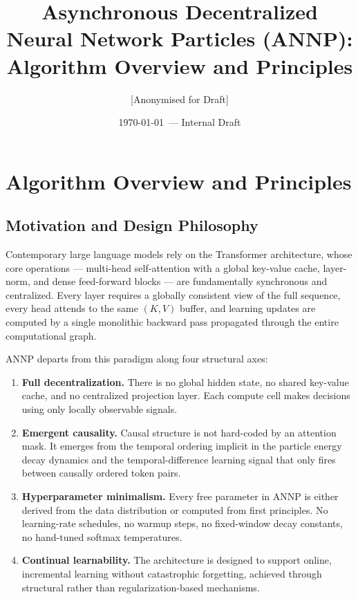 \documentclass[11pt,a4paper]{article}
\title{\textbf{Asynchronous Decentralized Neural Network Particles (ANNP):}\\
Algorithm Overview and Principles}
\author{[Anonymised for Draft]}
\date{\today\ --- Internal Draft}
\theoremstyle{definition}
\begin{document}
\maketitle
\tableofcontents
\newpage

\section{Algorithm Overview and Principles}
\label{sec:algorithm}

\subsection{Motivation and Design Philosophy}
\label{sec:motivation}

Contemporary large language models rely on the Transformer architecture, whose core operations ---
multi-head self-attention with a global key-value cache, layer-norm, and dense feed-forward blocks ---
are fundamentally synchronous and centralized.
Every layer requires a globally consistent view of the full sequence, every head attends to the same
$(K,V)$ buffer, and learning updates are computed by a single monolithic backward pass propagated
through the entire computational graph.

ANNP departs from this paradigm along four structural axes:

\begin{enumerate}[leftmargin=2em]
  \item \textbf{Full decentralization.}
    There is no global hidden state, no shared key-value cache, and no centralized projection layer.
    Each compute cell makes decisions using only locally observable signals.
  \item \textbf{Emergent causality.}
    Causal structure is not hard-coded by an attention mask.
    It emerges from the temporal ordering implicit in the particle energy decay dynamics and
    the temporal-difference learning signal that only fires between causally ordered token pairs.
  \item \textbf{Hyperparameter minimalism.}
    Every free parameter in ANNP is either derived from the data distribution or computed from
    first principles. No learning-rate schedules, no warmup steps, no fixed-window decay constants,
    no hand-tuned softmax temperatures.
  \item \textbf{Continual learnability.}
    The architecture is designed to support online, incremental learning without catastrophic
    forgetting, achieved through structural rather than regularization-based mechanisms.
\end{enumerate}
\end{document}
